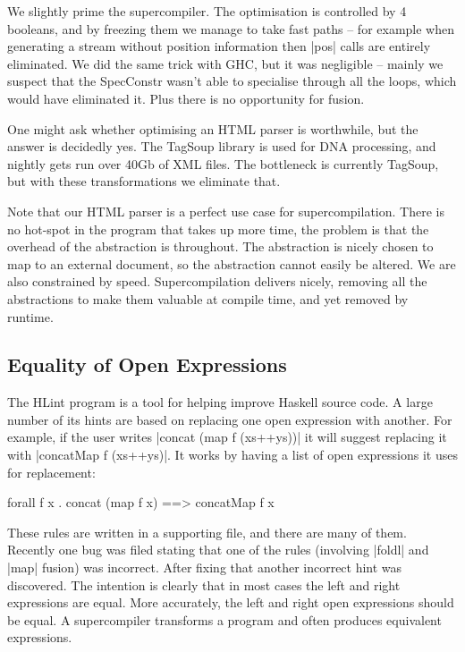 \documentclass{sigplanconf}
\begin{document}
We slightly prime the supercompiler. The optimisation is controlled by 4 booleans, and by freezing them we manage to take fast paths -- for example when generating a stream without position information then |pos| calls are entirely eliminated. We did the same trick with GHC, but it was negligible -- mainly we suspect that the SpecConstr wasn't able to specialise through all the loops, which would have eliminated it. Plus there is no opportunity for fusion.

One might ask whether optimising an HTML parser is worthwhile, but the answer is decidedly yes. The TagSoup library is used for DNA processing, and nightly gets run over 40Gb of XML files. The bottleneck is currently TagSoup, but with these transformations we eliminate that.

Note that our HTML parser is a perfect use case for supercompilation. There is no hot-spot in the program that takes up more time, the problem is that the overhead of the abstraction is throughout. The abstraction is nicely chosen to map to an external document, so the abstraction cannot easily be altered. We are also constrained by speed. Supercompilation delivers nicely, removing all the abstractions to make them valuable at compile time, and yet removed by runtime.

\subsection{Equality of Open Expressions}
\label{sec:hlint}

The HLint program \cite{hlint} is a tool for helping improve Haskell source code. A large number of its hints are based on replacing one open expression with another. For example, if the user writes |concat (map f (xs++ys))| it will suggest replacing it with |concatMap f (xs++ys)|. It works by having a list of open expressions it uses for replacement:

\begin{code}
forall f x . concat (map f x) ==> concatMap f x
\end{code}

These rules are written in a supporting file, and there are many of them. Recently one bug was filed stating that one of the rules (involving |foldl| and |map| fusion) was incorrect. After fixing that another incorrect hint was discovered. The intention is clearly that in most cases the left and right expressions are equal. More accurately, the left and right open expressions should be equal. A supercompiler transforms a program and often produces equivalent expressions.
\end{document}
